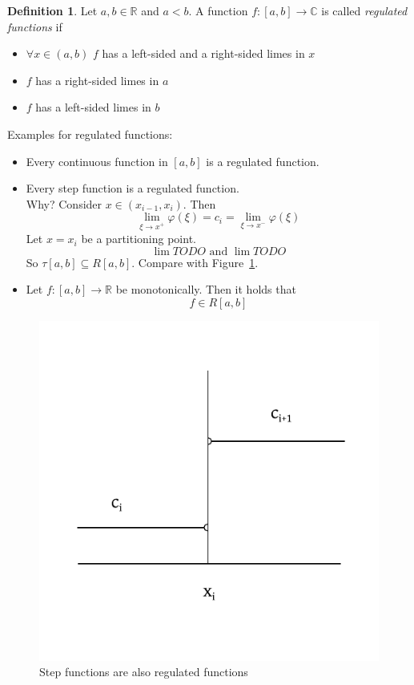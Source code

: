 \documentclass[a4paper,landscape,twocolumn]{article}
\theoremstyle{definition}
\newtheorem{defi}{Definition}
\begin{document}
\begin{defi}
  Let $a,b \in \mathbb R$ and $a < b$. A function $f: [a,b] \to \mathbb C$ is called
  \emph{regulated functions} if
  \begin{itemize}
    \item $\forall x \in (a,b)$ $f$ has a left-sided and a right-sided limes in $x$
    \item $f$ has a right-sided limes in $a$
    \item $f$ has a left-sided limes in $b$
  \end{itemize}
\end{defi}

Examples for regulated functions:
\begin{itemize}
  \item Every continuous function in $[a,b]$ is a regulated function.
  \item Every step function is a regulated function. \\
    Why? Consider $x \in (x_{i-1},x_i)$. Then
    \[ \lim_{\xi\to x^+} \varphi(\xi) = c_i = \lim_{\xi \to x^-} \varphi(\xi) \]
    Let $x = x_i$ be a partitioning point.
    \[ \lim TODO \text{ and } \lim TODO \]
    So $\tau[a,b] \subseteq R[a,b]$. Compare with Figure~\ref{img:step-regulated}.
  \item
    Let $f: [a,b] \to \mathbb R$ be monotonically.
    Then it holds that
    \[ f \in R[a,b] \]
\end{itemize}

\begin{figure}[!h]
  \begin{center}
    \includegraphics{img/step-functions-are-regulated-functions.pdf}
    \caption{Step functions are also regulated functions}
    \label{img:step-regulated}
  \end{center}
\end{figure}
\end{document}
